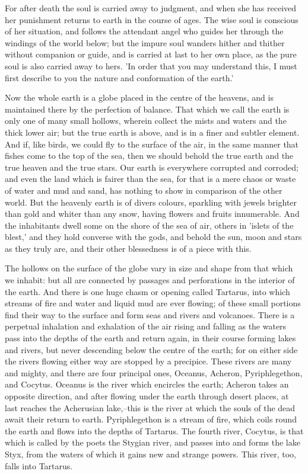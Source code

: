 For after death the soul is carried away to judgment, and when she has
received her punishment returns to earth in the course of ages. The wise
soul is conscious of her situation, and follows the attendant angel who
guides her through the windings of the world below; but the impure soul
wanders hither and thither without companion or guide, and is carried
at last to her own place, as the pure soul is also carried away to hers.
'In order that you may understand this, I must first describe to you the
nature and conformation of the earth.'

Now the whole earth is a globe placed in the centre of the heavens, and
is maintained there by the perfection of balance. That which we call the
earth is only one of many small hollows, wherein collect the mists and
waters and the thick lower air; but the true earth is above, and is in
a finer and subtler element. And if, like birds, we could fly to the
surface of the air, in the same manner that fishes come to the top of
the sea, then we should behold the true earth and the true heaven and
the true stars. Our earth is everywhere corrupted and corroded; and even
the land which is fairer than the sea, for that is a mere chaos or waste
of water and mud and sand, has nothing to show in comparison of the
other world. But the heavenly earth is of divers colours, sparkling with
jewels brighter than gold and whiter than any snow, having flowers and
fruits innumerable. And the inhabitants dwell some on the shore of the
sea of air, others in 'islets of the blest,' and they hold converse
with the gods, and behold the sun, moon and stars as they truly are, and
their other blessedness is of a piece with this.

The hollows on the surface of the globe vary in size and shape from that
which we inhabit: but all are connected by passages and perforations in
the interior of the earth. And there is one huge chasm or opening called
Tartarus, into which streams of fire and water and liquid mud are ever
flowing; of these small portions find their way to the surface and
form seas and rivers and volcanoes. There is a perpetual inhalation and
exhalation of the air rising and falling as the waters pass into the
depths of the earth and return again, in their course forming lakes
and rivers, but never descending below the centre of the earth; for on
either side the rivers flowing either way are stopped by a precipice.
These rivers are many and mighty, and there are four principal ones,
Oceanus, Acheron, Pyriphlegethon, and Cocytus. Oceanus is the river
which encircles the earth; Acheron takes an opposite direction, and
after flowing under the earth through desert places, at last reaches the
Acherusian lake,--this is the river at which the souls of the dead await
their return to earth. Pyriphlegethon is a stream of fire, which coils
round the earth and flows into the depths of Tartarus. The fourth river,
Cocytus, is that which is called by the poets the Stygian river, and
passes into and forms the lake Styx, from the waters of which it gains
new and strange powers. This river, too, falls into Tartarus.

